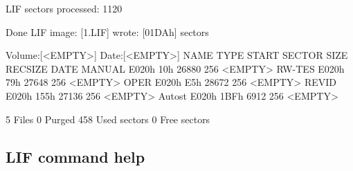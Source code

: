 \begin{DoxyPre}LIF sectors processed: 1120\end{DoxyPre}



\begin{DoxyPre}Done LIF image: [1.LIF] wrote: [01DAh] sectors\end{DoxyPre}



\begin{DoxyPre}Volume:[<EMPTY>] Date:[<EMPTY>]
NAME         TYPE   START SECTOR        SIZE    RECSIZE   DATE
MANUAL      E020h            10h       26880        256   <EMPTY>
RW-TES      E020h            79h       27648        256   <EMPTY>
OPER        E020h            E5h       28672        256   <EMPTY>
REVID       E020h           155h       27136        256   <EMPTY>
Autost      E020h           1BFh        6912        256   <EMPTY>\end{DoxyPre}



\begin{DoxyPre}       5 Files
       0 Purged
     458 Used sectors
       0 Free sectors\end{DoxyPre}



\begin{DoxyPre}\end{DoxyPre}
 



\subsection*{L\+IF command help}


